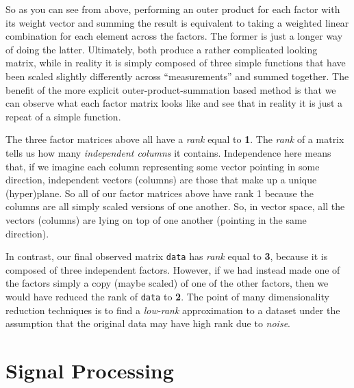 \documentclass[11pt]{article}
\begin{document}
    So as you can see from above, performing an outer product for each
factor with its weight vector and summing the result is equivalent to
taking a weighted linear combination for each element across the
factors. The former is just a longer way of doing the latter.
Ultimately, both produce a rather complicated looking matrix, while in
reality it is simply composed of three simple functions that have been
scaled slightly differently across ``measurements'' and summed together.
The benefit of the more explicit outer-product-summation based method is
that we can observe what each factor matrix looks like and see that in
reality it is just a repeat of a simple function.

The three factor matrices above all have a \emph{rank} equal to
\textbf{1}. The \emph{rank} of a matrix tells us how many
\emph{independent columns} it contains. Independence here means that, if
we imagine each column representing some vector pointing in some
direction, independent vectors (columns) are those that make up a unique
(hyper)plane. So all of our factor matrices above have rank 1 because
the columns are all simply scaled versions of one another. So, in vector
space, all the vectors (columns) are lying on top of one another
(pointing in the same direction).

In contrast, our final observed matrix \texttt{data} has \emph{rank}
equal to \textbf{3}, because it is composed of three independent
factors. However, if we had instead made one of the factors simply a
copy (maybe scaled) of one of the other factors, then we would have
reduced the rank of \texttt{data} to \textbf{2}. The point of many
dimensionality reduction techniques is to find a \emph{low-rank}
approximation to a dataset under the assumption that the original data
may have high rank due to \emph{noise}.

    \hypertarget{signal-processing}{%
\section{Signal Processing }\label{signal-processing}}


    
    
    
    
\end{document}
